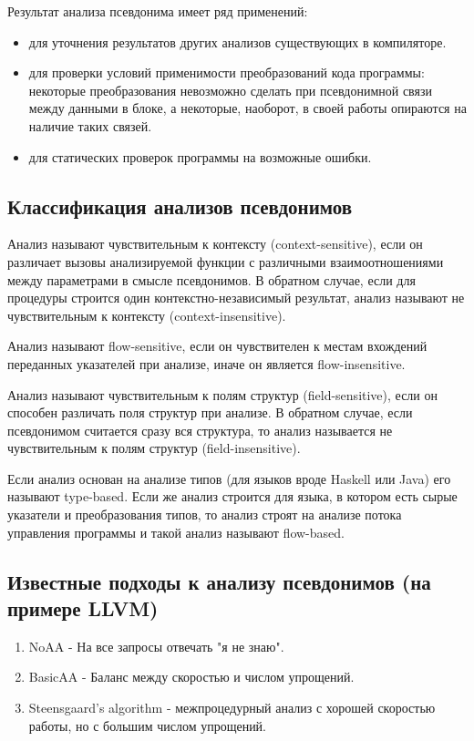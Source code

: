 Результат анализа псевдонима имеет ряд применений:
\begin{itemize}
\item для уточнения результатов других анализов существующих в компиляторе.
\item для проверки условий применимости преобразований кода программы: некоторые преобразования невозможно сделать при псевдонимной связи между данными в блоке, а некоторые, наоборот, в своей работы опираются на наличие таких связей. 
\item для статических проверок программы на возможные ошибки.
\end{itemize}

\subsection{Классификация анализов псевдонимов}

Анализ называют чувствительным к контексту (context-sensitive), если он различает вызовы анализируемой функции с различными взаимоотношениями между параметрами в смысле псевдонимов. В обратном случае, если для процедуры строится один контекстно-независимый результат, анализ называют не чувствительным к контексту (context-insensitive).

Анализ называют flow-sensitive, если он чувствителен к местам вхождений переданных указателей при анализе, иначе он является flow-insensitive.

Анализ называют чувствительным к полям структур (field-sensitive), если он способен различать поля структур при анализе. В обратном случае, если псевдонимом считается сразу вся структура, то анализ называется не чувствительным к полям структур (field-insensitive).

Если анализ основан на анализе типов (для языков вроде Haskell или Java) его называют  type-based. Если же анализ строится для языка, в котором есть сырые указатели и преобразования типов, то анализ строят на анализе потока управления программы и такой анализ называют flow-based.

\subsection{Известные подходы к анализу псевдонимов (на примере LLVM)}

\begin{enumerate}
\item NoAA - На все запросы отвечать "я не знаю".
\item BasicAA - Баланс между скоростью и числом упрощений.
\item Steensgaard’s algorithm - межпроцедурный анализ с хорошей скоростью работы, но с большим числом упрощений.
\end{enumerate}

